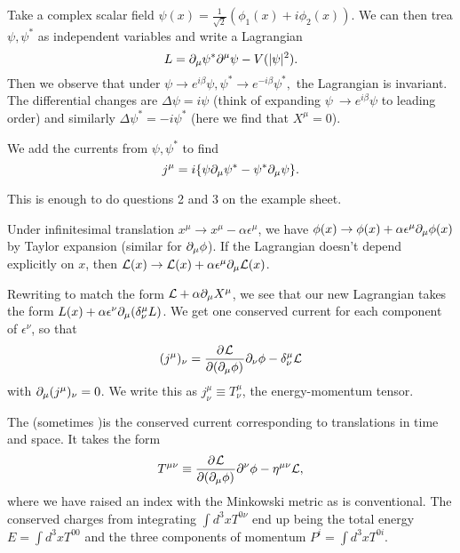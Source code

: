 \begin{exm}
Take a complex scalar field $\psi(x)=\frac{1}{\sqrt{2}}(\phi_1(x)+i\phi_2(x)).$ We can then trea $\psi, \psi^*$ as independent variables and write a Lagrangian
$$L=\partial_\mu \psi^* \partial^\mu \psi - V(|\psi|^2).$$
Then we observe that under $\psi\to e^{i\beta}\psi, \psi^* \to e^{-i\beta}\psi^*,$ the Lagrangian is invariant. The differential changes are $\Delta \psi = i \psi$ (think of expanding $\psi\ \to e^{i\beta}\psi$ to leading order) and similarly $\Delta \psi^*=-i\psi^*$ (here we find that $X^\mu=0$).

We add the currents from $\psi, \psi^*$ to find
$$j^\mu = i\{ \psi \partial_\mu \psi^* - \psi^* \partial_\mu \psi\}.$$
\end{exm}
This is enough to do questions 2 and 3 on the example sheet.
\begin{exm}
Under infinitesimal translation $x^\mu \to x^\mu -\alpha \epsilon^\mu$, we have $\phi(x)\to \phi(x)+\alpha \epsilon^\mu \partial_\mu \phi(x)$ by Taylor expansion (similar for $\partial_\mu\phi$). If the Lagrangian doesn't depend explicitly on $x$, then $\mathcal L(x)\to \mathcal L(x) +\alpha \epsilon^\mu \partial_\mu \mathcal L(x)$.

Rewriting to match the form $\mathcal L+\alpha \partial_\mu X^\mu$, we see that our new Lagrangian takes the form
$L(x)+\alpha \epsilon^\nu \partial_\mu (\delta^\mu_\nu L)$. We get one conserved current for each component of $\epsilon^\nu$, so that
$$(j^\mu)_\nu = \frac{\partial^{} \mathcal L}{\partial (\partial_\mu \phi) ^{}}\partial_\nu \phi - \delta^\mu_\nu \mathcal L$$ with $\partial_\mu(j^\mu)_\nu=0$.
We write this as $j^\mu_\nu \equiv T^\mu_\nu$, the energy-momentum tensor. 

\begin{defn}
The  (sometimes )is the conserved current corresponding to translations in time and space. It takes the form 
$$T^{\mu\nu} \equiv \frac{\partial^{} \mathcal L}{\partial (\partial_\mu \phi) ^{}}\partial^\nu \phi - \eta^{\mu\nu} \mathcal L,$$
where we have raised an index with the Minkowski metric as is conventional. The conserved charges from integrating $\int d^3x T^{0\nu}$ end up being the total energy $E=\int d^3x T^{00}$ and the three components of momentum $P^i=\int d^3x T^{0i}$.
\end{defn}
\end{exm}
